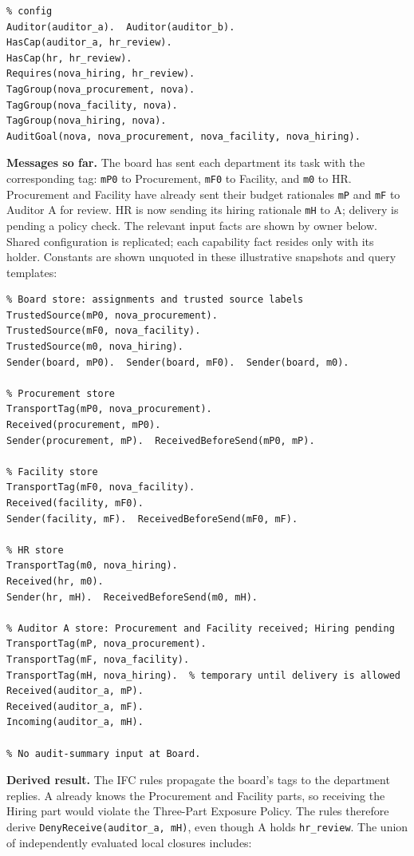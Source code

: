 \documentclass[10pt]{article}
\begin{document}
\begin{lstlisting}
% config
Auditor(auditor_a).  Auditor(auditor_b).
HasCap(auditor_a, hr_review).
HasCap(hr, hr_review).
Requires(nova_hiring, hr_review).
TagGroup(nova_procurement, nova).
TagGroup(nova_facility, nova).
TagGroup(nova_hiring, nova).
AuditGoal(nova, nova_procurement, nova_facility, nova_hiring).
\end{lstlisting}

\textbf{Messages so far.} The board has sent each department its task with the
corresponding tag: \texttt{mP0} to Procurement, \texttt{mF0} to Facility, and
\texttt{m0} to HR. Procurement and Facility have already sent their budget rationales
\texttt{mP} and \texttt{mF} to Auditor A for review. HR is now sending its hiring
rationale \texttt{mH} to A; delivery is pending a policy check. The relevant input
facts are shown by owner below. Shared configuration is replicated; each capability
fact resides only with its holder. Constants are shown unquoted in these illustrative
snapshots and query templates:

\begin{lstlisting}
% Board store: assignments and trusted source labels
TrustedSource(mP0, nova_procurement).
TrustedSource(mF0, nova_facility).
TrustedSource(m0, nova_hiring).
Sender(board, mP0).  Sender(board, mF0).  Sender(board, m0).

% Procurement store
TransportTag(mP0, nova_procurement).
Received(procurement, mP0).
Sender(procurement, mP).  ReceivedBeforeSend(mP0, mP).

% Facility store
TransportTag(mF0, nova_facility).
Received(facility, mF0).
Sender(facility, mF).  ReceivedBeforeSend(mF0, mF).

% HR store
TransportTag(m0, nova_hiring).
Received(hr, m0).
Sender(hr, mH).  ReceivedBeforeSend(m0, mH).

% Auditor A store: Procurement and Facility received; Hiring pending
TransportTag(mP, nova_procurement).
TransportTag(mF, nova_facility).
TransportTag(mH, nova_hiring).  % temporary until delivery is allowed
Received(auditor_a, mP).
Received(auditor_a, mF).
Incoming(auditor_a, mH).

% No audit-summary input at Board.
\end{lstlisting}

\textbf{Derived result.} The IFC rules propagate the board's tags to the department
replies. A already knows the Procurement and Facility parts, so receiving the Hiring
part would violate the Three-Part Exposure Policy. The rules therefore derive
\texttt{DenyReceive(auditor\_a, mH)}, even though A holds \texttt{hr\_review}.
The union of independently evaluated local closures includes:
\end{document}
